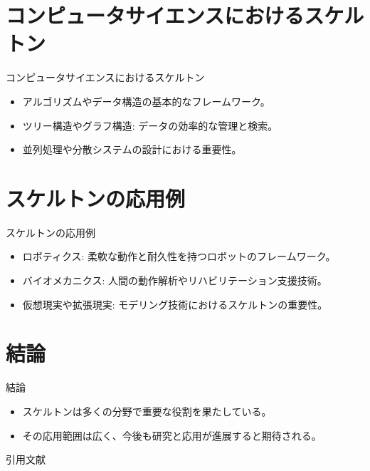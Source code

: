 \documentclass[aspectratio=169]{beamer}
\begin{document}
\section{コンピュータサイエンスにおけるスケルトン}

\begin{frame}{コンピュータサイエンスにおけるスケルトン}
  \begin{itemize}
    \item アルゴリズムやデータ構造の基本的なフレームワーク。
    \item ツリー構造やグラフ構造: データの効率的な管理と検索。
    \item 並列処理や分散システムの設計における重要性。
  \end{itemize}
\end{frame}

\section{スケルトンの応用例}

\begin{frame}{スケルトンの応用例}
  \begin{itemize}
    \item ロボティクス: 柔軟な動作と耐久性を持つロボットのフレームワーク。
    \item バイオメカニクス: 人間の動作解析やリハビリテーション支援技術。
    \item 仮想現実や拡張現実: モデリング技術におけるスケルトンの重要性。
  \end{itemize}
\end{frame}

\section{結論}

\begin{frame}{結論}
  \begin{itemize}
    \item スケルトンは多くの分野で重要な役割を果たしている。
    \item その応用範囲は広く、今後も研究と応用が進展すると期待される。
  \end{itemize}
\end{frame}

\begin{frame}{引用文献}
  \printbibliography[title=引用文献]{}
\end{frame}
\end{document}
